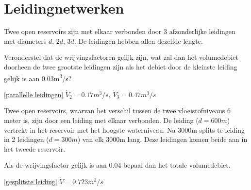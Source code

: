 \chapter{Leidingnetwerken}
\label{sec:Leidingnetwerken}
\begin{toepassing}
	\label{parallelle leidingen}
Twee open reservoirs zijn met elkaar verbonden door 3 afzonderlijke leidingen met diameters $d$, $2d$, $3d$. De leidingen hebben allen dezelfde lengte.
		
Veronderstel dat de wrijvingsfactoren gelijk zijn, wat zal dan het volumedebiet doorheen de twee grootste leidingen zijn als het debiet door de kleinste leiding gelijk is aan 0.03\unit{m^3/s}? 
\end{toepassing}
\begin{antwoord}{\ref{parallelle leidingen}}
	$\dot{V}_2 = 0.17\unit{m^3/s}$, $\dot{V}_3 = 0.47\unit{m^3/s}$
\end{antwoord}
\vfill
\begin{toepassing}[*]
	\label{gesplitste leiding}
Twee open reservoirs, waarvan het verschil tussen de twee vloeistofniveaus 6 meter is, zijn door een leiding met elkaar verbonden. De leiding ($d=600\unit{m}$) vertrekt in het reservoir met het hoogste waterniveau. Na 3000m splits te leiding in 2 leidingen ($d=300\unit{m}$) van elk 3000m lang. Deze leidingen komen beide aan in het tweede reservoir. 
		
Als de wrijvingsfactor gelijk is aan 0.04 bepaal dan het totale volumedebiet. 
\end{toepassing}
\begin{antwoord}{\ref{gesplitste leiding}}
		$\dot{V} = 0.723\unit{m^3/s}$
\end{antwoord}
